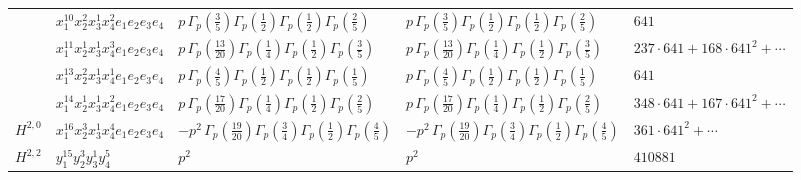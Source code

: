 \documentclass[11pt]{article}
\begin{document}
\begin{table}[ht]
{\begin{tabular}{@{}lllll@{}}
 & $x_{1}^{10} x_{2}^{2} x_{3}^{1} x_{4}^{2}  e_{1} e_{2} e_{3} e_{4}$ & $p \, \Gamma_p \left( \frac{3}{5} \right) \Gamma_p \left( \frac{1}{2} \right) \Gamma_p \left( \frac{1}{2} \right) \Gamma_p \left( \frac{2}{5} \right)$ & $p \, \Gamma_p \left( \frac{3}{5} \right) \Gamma_p \left( \frac{1}{2} \right) \Gamma_p \left( \frac{1}{2} \right) \Gamma_p \left( \frac{2}{5} \right)$ & $641$ \\
 & $x_{1}^{11} x_{2}^{1} x_{3}^{1} x_{4}^{3}  e_{1} e_{2} e_{3} e_{4}$ & $p \, \Gamma_p \left( \frac{13}{20} \right) \Gamma_p \left( \frac{1}{4} \right) \Gamma_p \left( \frac{1}{2} \right) \Gamma_p \left( \frac{3}{5} \right)$ & $p \, \Gamma_p \left( \frac{13}{20} \right) \Gamma_p \left( \frac{1}{4} \right) \Gamma_p \left( \frac{1}{2} \right) \Gamma_p \left( \frac{3}{5} \right)$ & $237{\cdot}641{+}168{\cdot}641^{2}{+}\cdots$ \\
 & $x_{1}^{13} x_{2}^{2} x_{3}^{1} x_{4}^{1}  e_{1} e_{2} e_{3} e_{4}$ & $p \, \Gamma_p \left( \frac{4}{5} \right) \Gamma_p \left( \frac{1}{2} \right) \Gamma_p \left( \frac{1}{2} \right) \Gamma_p \left( \frac{1}{5} \right)$ & $p \, \Gamma_p \left( \frac{4}{5} \right) \Gamma_p \left( \frac{1}{2} \right) \Gamma_p \left( \frac{1}{2} \right) \Gamma_p \left( \frac{1}{5} \right)$ & $641$ \\
 & $x_{1}^{14} x_{2}^{1} x_{3}^{1} x_{4}^{2}  e_{1} e_{2} e_{3} e_{4}$ & $p \, \Gamma_p \left( \frac{17}{20} \right) \Gamma_p \left( \frac{1}{4} \right) \Gamma_p \left( \frac{1}{2} \right) \Gamma_p \left( \frac{2}{5} \right)$ & $p \, \Gamma_p \left( \frac{17}{20} \right) \Gamma_p \left( \frac{1}{4} \right) \Gamma_p \left( \frac{1}{2} \right) \Gamma_p \left( \frac{2}{5} \right)$ & $348{\cdot}641{+}167{\cdot}641^{2}{+}\cdots$ \\
\midrule
$H^{2,0}$ & $x_{1}^{16} x_{2}^{3} x_{3}^{1} x_{4}^{4}  e_{1} e_{2} e_{3} e_{4}$ & $- p^{2} \, \Gamma_p \left( \frac{19}{20} \right) \Gamma_p \left( \frac{3}{4} \right) \Gamma_p \left( \frac{1}{2} \right) \Gamma_p \left( \frac{4}{5} \right)$ & $- p^{2} \, \Gamma_p \left( \frac{19}{20} \right) \Gamma_p \left( \frac{3}{4} \right) \Gamma_p \left( \frac{1}{2} \right) \Gamma_p \left( \frac{4}{5} \right)$ & $361{\cdot}641^{2}{+}\cdots$ \\
\midrule
$H^{2,2}$ & $y_{1}^{15} y_{2}^{3} y_{3}^{1} y_{4}^{5}$ & $p^{2} \,$ & $p^{2} \,$ & $410881$ \\
\bottomrule
\end{tabular}
}
\renewcommand{\arraystretch}{1.0}
\end{table}
\end{document}
